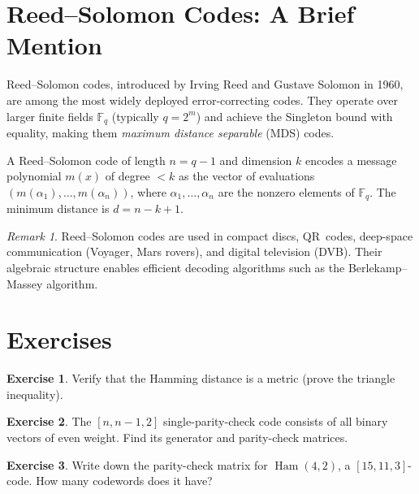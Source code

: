 \documentclass[12pt,a4paper,openany]{book}
\theoremstyle{definition}
\newtheorem{exercise}{Exercise}[chapter]
\theoremstyle{plain}
\theoremstyle{remark}
\newtheorem{remark}[definition]{Remark}
\begin{document}
\section{Reed--Solomon Codes: A Brief Mention}
\label{sec:reed-solomon}

Reed--Solomon codes, introduced by Irving Reed and Gustave Solomon in
1960, are among the most widely deployed error-correcting codes.  They
operate over larger finite fields $\mathbb{F}_q$ (typically
$q=2^m$) and achieve the Singleton bound with equality, making them
\emph{maximum distance separable} (MDS) codes.

A Reed--Solomon code of length $n=q-1$ and dimension $k$ encodes a
message polynomial $m(x)$ of degree $<k$ as the vector of evaluations
$(m(\alpha_1),\dots,m(\alpha_n))$, where $\alpha_1,\dots,\alpha_n$ are
the nonzero elements of $\mathbb{F}_q$.  The minimum distance is
$d=n-k+1$.

\begin{remark}
Reed--Solomon codes are used in compact discs, QR~codes, deep-space
communication (Voyager, Mars rovers), and digital television (DVB).
Their algebraic structure enables efficient decoding algorithms such as
the Berlekamp--Massey algorithm.
\end{remark}

\section{Exercises}
\label{sec:ex-ch11}

\begin{exercise}
\label{exo:hamming-verify}
Verify that the Hamming distance is a metric (prove the triangle
inequality).
\end{exercise}

\begin{exercise}
\label{exo:parity-check}
The $[n,n-1,2]$ single-parity-check code consists of all binary vectors
of even weight.  Find its generator and parity-check matrices.
\end{exercise}

\begin{exercise}
\label{exo:hamming-15}
Write down the parity-check matrix for $\operatorname{Ham}(4,2)$, a
$[15,11,3]$-code.  How many codewords does it have?
\end{exercise}
\end{document}
